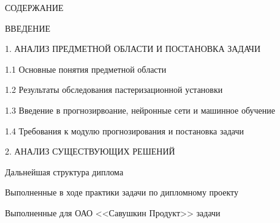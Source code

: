 {\gostTitleFont
    \redline
    СОДЕРЖАНИЕ
} 

\subtitlespace

{\gostFont

    \par ВВЕДЕНИЕ  
    \par 1. АНАЛИЗ ПРЕДМЕТНОЙ ОБЛАСТИ И ПОСТАНОВКА ЗАДАЧИ  
    \par 1.1 Основные понятия предметной области 
    \par 1.2 Результаты обследования пастеризационной установки  
    \par 1.3 Введение в прогнозирвоание, нейронные сети и машинное обучение  
    \par 1.4 Требования к модулю прогнозирования и постановка задачи  
    \par 2. АНАЛИЗ СУЩЕСТВУЮЩИХ РЕШЕНИЙ  
    \par Дальнейшая структура диплома  
    \par Выполненные в ходе практики задачи по дипломному проекту  
    \par Выполненные для ОАО <<Савушкин Продукт>> задачи  
    \par 
}